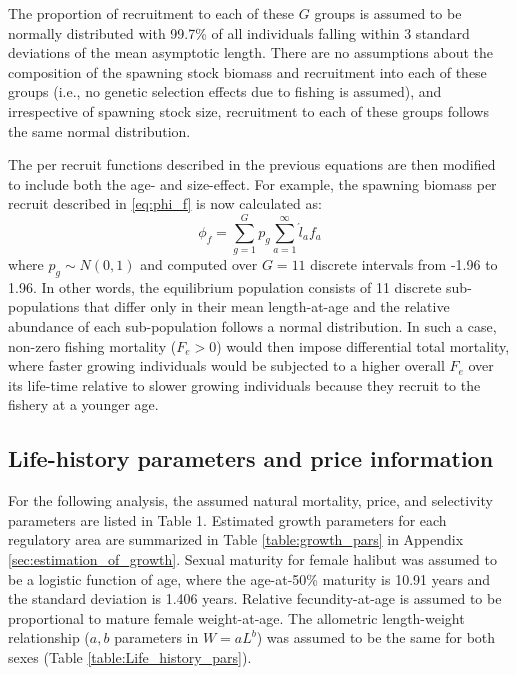 The proportion of recruitment to each of these $G$ groups is assumed to be normally distributed with 99.7\% of all individuals falling within 3 standard deviations of the mean asymptotic length.  There are no assumptions about the composition of the spawning stock biomass and recruitment into each of these groups (i.e., no genetic selection effects due to fishing is assumed), and irrespective of spawning stock size, recruitment to each of these groups follows the same normal distribution.

The per recruit functions described in the previous equations are then modified to include both the age- and size-effect.  For example, the spawning biomass per recruit described in \eqref{eq:phi_f} is now calculated as:
\begin{equation}
	\phi_{f} =\sum_{g=1}^G p_g \sum_{a=1}^\infty \acute{l}_a f_a\label{eq:phi_fg}
\end{equation}
where $p_g \sim N(0,1)$ and computed over $G=11$ discrete intervals from -1.96 to 1.96.  In other words, the equilibrium population consists of 11 discrete sub-populations that differ only in their mean length-at-age and the relative abundance of each sub-population follows a normal distribution.  In such a case, non-zero fishing mortality  ($F_e>0$) would then impose differential total mortality, where faster growing individuals would be subjected to a higher overall $F_e$ over its life-time relative to slower growing individuals because they recruit to the fishery at a younger age.

\subsection*{Life-history parameters and price information} %
\label{sub:life_history_parameters_and_price_information}
For the following analysis, the assumed natural mortality, price,  and selectivity parameters are listed in Table 1.  Estimated growth parameters for each regulatory area are summarized in Table \ref{table:growth_pars} in Appendix \ref{sec:estimation_of_growth}.  Sexual maturity for female halibut was assumed to be a logistic function of age, where the age-at-50\% maturity is 10.91 years and the standard deviation is 1.406 years.  Relative fecundity-at-age is assumed to be proportional to mature female weight-at-age.  The allometric length-weight relationship ($a,b$ parameters in $W = a L ^b$) was assumed to be the same for both sexes (Table \ref{table:Life_history_pars}).

